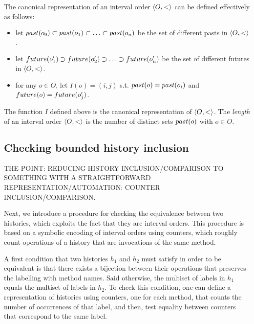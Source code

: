 The canonical representation of an interval order $\left\langle {O,<} \right\rangle$ can be defined effectively 
as follows:
\begin{itemize}

	\item let $past({o_0})\subset past({o_1})\subset \ldots\subset
past({o_n})$ be the set of different pasts in $\left\langle {O,<} \right\rangle$. 

	\item let $future({o_1'})\supset future({o_2'})\supset \ldots\supset
future({o_n'})$ be the set of different futures in $\left\langle {O,<} \right\rangle$.

	\item for any $o\in O$, let $I(o)=(i,j)$ s.t. $past({o})=past({o_i})$ and
$future({o})=future({o_j'})$.

\end{itemize}

\begin{lemma}

  The function $I$ defined above is the canonical representation of $\left\langle {O,<} \right\rangle$.
  The \emph{length} of an interval order $\left\langle {O,<} \right\rangle$ is the number of distinct sets $past({o})$ with $o\in O$.

\end{lemma}




\subsection{Checking bounded history inclusion}

THE POINT: REDUCING HISTORY INCLUSION/COMPARISON TO SOMETHING WITH A
STRAIGHTFORWARD REPRESENTATION/AUTOMATION: COUNTER INCLUSION/COMPARISON.


Next, we introduce a procedure for checking the equivalence between two
histories, which exploits the fact that they are interval orders. This
procedure is based on a symbolic encoding of interval orders using counters,
which roughly count operations of a history that are invocations of the same
method.

A first condition that two histories $h_1$ and $h_2$ must satisfy in order to
be equivalent is that there exists a bijection between their operations that
preserves the labelling with method names. Said otherwise, the multiset of
labels in $h_1$ equals the multiset of labels in $h_2$. To check this
condition, one can define a representation of histories using counters, one for
each method, that counts the number of occurrences of that label, and then,
test equality between counters that correspond to the same label.

